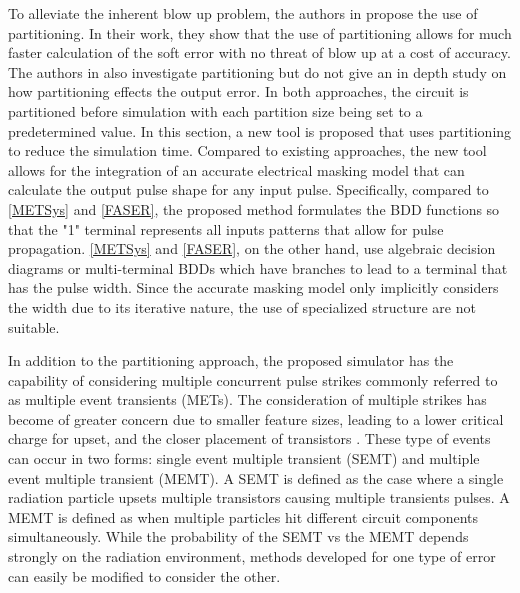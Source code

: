 To alleviate the inherent blow up problem, the authors in \cite{FASER} propose the use of partitioning. In their work, they show that the use of partitioning allows for much faster calculation of the soft error with no threat of blow up at a cost of accuracy. The authors in \cite{METSys} also investigate partitioning but do not give an in depth study on how partitioning effects the output error. In both approaches, the circuit is partitioned before simulation with each partition size being set to a predetermined value. In this section, a new tool is proposed that uses partitioning to reduce the simulation time. Compared to existing approaches, the new tool allows for the integration of an accurate electrical masking model that can calculate the output pulse shape for any input pulse. Specifically, compared to \ref{METSys} and \ref{FASER}, the proposed method formulates the BDD functions so that the "1" terminal represents all inputs patterns that allow for pulse propagation. \ref{METSys} and \ref{FASER}, on the other hand, use algebraic decision diagrams or multi-terminal BDDs which have branches to lead to a terminal that has the pulse width. Since the accurate masking model only implicitly considers the width due to its iterative nature, the use of specialized structure are not suitable.

In addition to the partitioning approach, the proposed simulator has the capability of considering multiple concurrent pulse strikes commonly referred to as multiple event transients (METs). The consideration of multiple strikes has become of greater concern due to smaller feature sizes, leading to a lower critical charge for upset, and the closer placement of transistors \cite{Rossi2005}. These type of events can occur in two forms: single event multiple transient (SEMT) and multiple event multiple transient (MEMT). A SEMT is defined as the case where a single radiation particle upsets multiple transistors causing multiple transients pulses. A MEMT is defined as when multiple particles hit different circuit components simultaneously. While the probability of the SEMT vs the MEMT depends strongly on the radiation environment, methods developed for one type of error can easily be modified to consider the other. 

